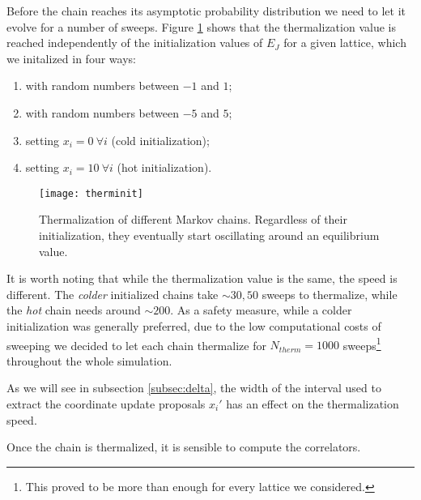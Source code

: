 Before the chain reaches its asymptotic probability distribution we need to let it evolve for a number of sweeps. Figure \ref{fig:therminit} shows that
the thermalization value is reached independently of the initialization values of $E_{J}$ for a given lattice, which we initalized in four
ways:
\begin{enumerate}
  \item with random numbers between $-1$ and $1$;
  \item  with random numbers between $-5$ and $5$;
  \item setting $x_{i}=0\ \forall i$ (cold initialization);
  \item setting $x_{i}=10\ \forall i$ (hot initialization).
\end{enumerate}
\begin{figure}[htp]
  \centering
  \texttt{[image: therminit]}
  \caption{\label{fig:therminit} Thermalization of different Markov chains. Regardless of their initialization, they eventually start oscillating around an equilibrium value.}
\end{figure}
It is worth noting that while the thermalization value is the same, the speed is different. The \textit{colder} initialized chains take $\sim 30,50$ sweeps to thermalize, while the \textit{hot} chain needs around $\sim 200$. As a safety measure, while a colder initialization
was generally preferred,
due to the low computational costs of sweeping we decided to let each chain thermalize for $N_{therm}=1000$ sweeps\footnote{This proved to be more than enough for every lattice we considered.} throughout the whole simulation.

As we will see in subsection \ref{subsec:delta}, the width of the interval used to extract the coordinate update proposals $x_{i}'$ has an effect on the thermalization speed.

Once the chain is thermalized, it is sensible to compute the correlators.
